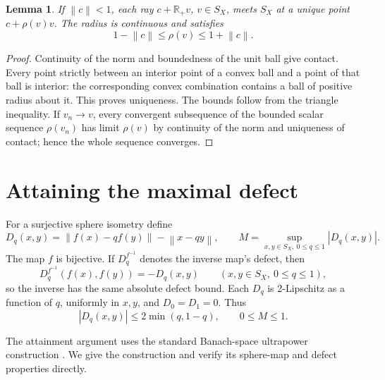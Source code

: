 \documentclass[11pt]{article}
\newtheorem{lemma}[theorem]{Lemma}
\theoremstyle{remark}
\newcommand{\R}{\mathbb R}
\newcommand{\norm}[1]{\left\lVert#1\right\rVert}
\begin{document}
\begin{lemma}\label{lem:radial}
If $\norm{c}<1$, each ray $c+\R_+v$, $v\in S_X$, meets $S_X$ at a unique point $c+\rho(v)v$. The radius is continuous and satisfies
\[
1-\norm{c}\le\rho(v)\le1+\norm{c}.
\]
\end{lemma}
\begin{proof}
Continuity of the norm and boundedness of the unit ball give contact. Every point strictly between an interior point of a convex ball and a point of that ball is interior: the corresponding convex combination contains a ball of positive radius about it. This proves uniqueness. The bounds follow from the triangle inequality. If $v_n\to v$, every convergent subsequence of the bounded scalar sequence $\rho(v_n)$ has limit $\rho(v)$ by continuity of the norm and uniqueness of contact; hence the whole sequence converges.
\end{proof}

\section{Attaining the maximal defect}\label{sec:attainment}

For a surjective sphere isometry define
\begin{equation}\label{eq:defect}
D_q(x,y)=\norm{f(x)-qf(y)}-\norm{x-qy},\qquad
M=\sup_{x,y\in S_X,\ 0\le q\le1}|D_q(x,y)|.
\end{equation}
The map $f$ is bijective. If $D_q^{f^{-1}}$ denotes the inverse map's defect, then
\begin{equation}\label{eq:inverse-defect}
D_q^{f^{-1}}(f(x),f(y))=-D_q(x,y)
\qquad(x,y\in S_X,\ 0\le q\le1),
\end{equation}
so the inverse has the same absolute defect bound. Each $D_q$ is 2-Lipschitz as a function of $q$, uniformly in $x,y$, and $D_0=D_1=0$. Thus
\begin{equation}\label{eq:defectbound}
|D_q(x,y)|\le2\min(q,1-q),\qquad 0\le M\le1.
\end{equation}

The attainment argument uses the standard Banach-space ultrapower construction \cite{DacunhaCastelle1972}. We give the construction and verify its sphere-map and defect properties directly.
\end{document}
